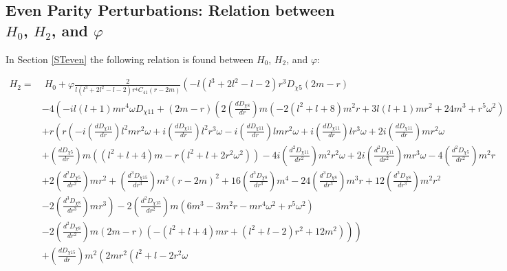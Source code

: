 \documentclass[10pt,twocolumn,preprintnumbers,amsmath,amssymb,nofootinbib
,superscriptaddress]{revtex4-1}
\begin{document}
{{{\subsection{Even Parity Perturbations: Relation between $H_0$, $H_2$, and $\varphi$}\label{appendixSTRel}
In Section \ref{STeven} the following relation is found between $H_0$, $H_2$, and $\varphi$:
\begin{widetext}
\begin{align}
H_2=&\;H_0+\varphi\frac{2}{l \left(l^3+2 l^2-l-2\right) r^4 C_{41} (r-2
 m)} \left(-l \left(l^3+2 l^2-l-2\right) r^3 D_{\chi5} (2
 m-r)\right.\nonumber\\
 &\left.-4 \left(-i l (l+1) m r^4 \omega D_{\chi11} +(2 m-r) \left(2
 \left(\frac{dD_{\chi8}}{dr}\right) m \left(-2 \left(l^2+l+8\right) m^2 r+3 l (l+1) m r^2+24 m^3+r^5 \omega
 ^2\right)\right.\right.\right.\nonumber\\
 &\left.\left.\left.+r \left(r \left(-i \left(\frac{dD_{\chi11}}{dr}\right) l^2 m r^2 \omega +i \left(\frac{dD_{\chi11}}{dr}\right) l^2 r^3
 \omega -i \left(\frac{dD_{\chi11}}{dr}\right) l m r^2 \omega +i \left(\frac{dD_{\chi11}}{dr}\right) l r^3 \omega +2 i
 \left(\frac{dD_{\chi11}}{dr}\right) m r^2 \omega\right.\right.\right.\right.\right.\nonumber\\
 &\left.\left.\left.\left.\left. +\left(\frac{dD_{\chi5}}{dr}\right) m \left(\left(l^2+l+4\right) m-r
 \left(l^2+l+2 r^2 \omega ^2\right)\right)-4 i \left(\frac{d^2D_{\chi11}}{dr^2}\right) m^2 r^2 \omega +2 i
 \left(\frac{d^2D_{\chi11}}{dr^2}\right) m r^3 \omega -4 \left(\frac{d^2D_{\chi5}}{dr^2}\right) m^2 r\right.\right.\right.\right.\right.\nonumber\\
 &\left.\left.\left.\left.\left.+2 \left(\frac{d^2D_{\chi5}}{dr^2}\right) m
 r^2+\left(\frac{d^3D_{\chi15}}{dr^3}\right) m^2 (r-2 m)^2+16 \left(\frac{d^3D_{\chi8}}{dr^3}\right) m^4-24 \left(\frac{d^3D_{\chi8}}{dr^3}\right) m^3 r+12
 \left(\frac{d^3D_{\chi8}}{dr^3}\right) m^2 r^2\right.\right.\right.\right.\right.\nonumber\\
 &\left.\left.\left.\left.\left.-2 \left(\frac{d^3D_{\chi8}}{dr^3}\right) m r^3\right)-2 \left(\frac{d^2D_{\chi15}}{dr^2}\right) m \left(6
 m^3-3 m^2 r-m r^4 \omega ^2+r^5 \omega ^2\right)\right.\right.\right.\right.\nonumber\\
 &\left.\left.\left.\left.-2 \left(\frac{d^2D_{\chi8}}{dr^2}\right) m (2 m-r)
 \left(-\left(l^2+l+4\right) m r+\left(l^2+l-2\right) r^2+12
 m^2\right)\right)\right)\right.\right.\nonumber\\
 &\left.\left.+\left(\frac{dD_{\chi15}}{dr}\right) m^2 \left(2 m r^2 \left(l^2+l-2 r^2 \omega

\end{align}
\end{widetext}}}}
\end{document}
